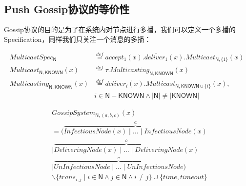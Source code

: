 \subsection{Push Gossip协议的等价性}

Gossip协议的目的是为了在系统内对节点进行多播，我们可以定义一个多播的Specification，同样我们只关注一个消息的多播：
\begin{definition} 
\begin{align*}
    MulticastSpec_\mathsf{N}&\stackrel{def}{=}accept_1(x).\overline{deliver_1}(x).Multicast_{\mathsf{N},\{1\}}(x)\\
    Multicast_{\mathsf{N},\mathsf{KNOWN}}(x)&\stackrel{def}{=}\tau.Multicasting_{\mathsf{N},\mathsf{KNOWN}}(x)\\
    Multicasting_{\mathsf{N},\mathsf{KNOWN}}(x)&\stackrel{def}{=}\overline{deliver_i}(x).Multicast_{\mathsf{N},\mathsf{KNOWN}\cup\{i\}}(x), \\
    &i\in \mathsf{N}-\mathsf{KNOWN} \wedge |\mathsf{N}|\neq |\mathsf{KNOWN}|
 \end{align*}
\end{definition} 

 \begin{definition} 
    \begin{align*}
   &GossipSystem_{\mathsf{N},(a,b,c)}(x)\\
   &= (\stackrel{a}{\overbrace{InfectiousNode(x)\mid \dots \mid InfectiousNode(x)}}\\
   &\mid \stackrel{b}{\overbrace{DeliveringNode(x)\mid \dots\mid DeliveringNode(x)}}\\
   &\mid \stackrel{c}{\overbrace{UnInfectiousNode\mid \dots \mid UnInfectiousNode}})\\
   &\backslash \{trans_{i,j}\mid i\in \mathsf{N} \wedge j\in \mathsf{N} \wedge i\neq j\}\cup \{time, timeout\}
\end{align*}
 \end{definition} 

